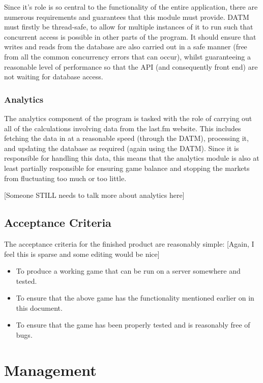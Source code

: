 \documentclass[a4paper,10pt,twoside]{article}
\begin{document}
Since it's role is so central to the functionality of the entire application, there are numerous requirements and guarantees that this module must provide. DATM must firstly be thread-safe, to allow for multiple instances of it to run such that concurrent access is possible in other parts of the program. It should ensure that writes and reads from the database are also carried out in a safe manner (free from all the common concurrency errors that can occur), whilst guaranteeing a reasonable level of performance so that the API (and consequently front end) are not waiting for database access. 

\subsubsection{Analytics}

The analytics component of the program is tasked with the role of carrying out all of the calculations involving data from the last.fm website. This includes fetching the data in at a reasonable speed (through the DATM), processing it, and updating the database as required (again using the DATM). Since it is responsible for handling this data, this means that the analytics module is also at least partially responsible for ensuring game balance and stopping the markets from fluctuating too much or too little.

[Someone STILL needs to talk more about analytics here]

\subsection{Acceptance Criteria}

The acceptance criteria for the finished product are reasonably simple: [Again, I feel this is sparse and some editing would be nice]

\begin{itemize}
\item To produce a working game that can be run on a server somewhere and tested.
\item To ensure that the above game has the functionality mentioned earlier on in this document.
\item To ensure that the game has been properly tested and is reasonably free of bugs.
\end{itemize}

\section{Management}
\end{document}

